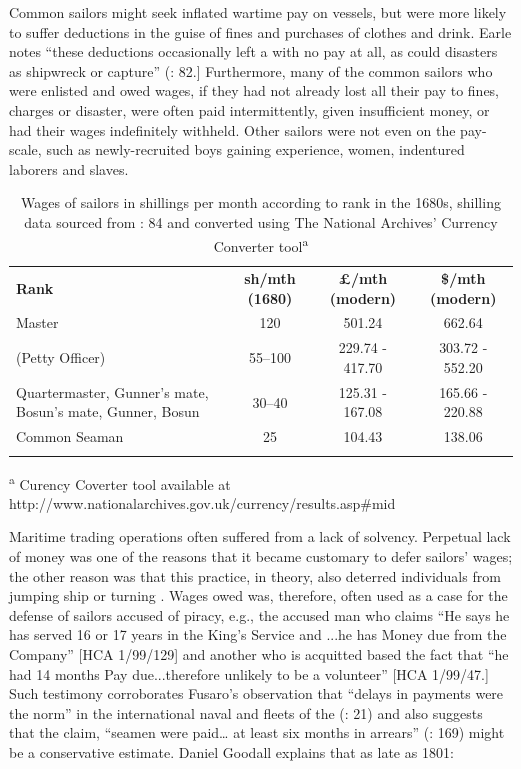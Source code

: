 Common sailors might seek inflated wartime pay on  vessels, but were more likely to suffer deductions in the guise of fines and purchases of clothes and drink. Earle notes “these deductions occasionally left a  with no pay at all, as could disasters as shipwreck or capture” (\citeyear*{Earle1998}: 82.] Furthermore, many of the common sailors who were enlisted and owed wages, if they had not already lost all their pay to fines, charges or disaster, were often paid intermittently, given insufficient money, or had their wages indefinitely withheld. Other sailors were not even on the pay-scale, such as newly-recruited boys gaining experience, women, indentured laborers and slaves. 

\begin{table}
\caption{\label{tab:key:3.2} Wages of sailors in shillings per month according to rank in the 1680s, shilling data sourced from \citealt{Earle1998}: 84 and converted using The National Archives’ Currency Converter tool\textsuperscript{a}}

\begin{tabularx}{\textwidth}{Qccc}
\lsptoprule

\textbf{Rank} & \textbf{sh/mth (1680)} & \textbf{£/mth (modern)} & \textbf{\$/mth (modern)}\\
Master & 120 & 501.24 & 662.64\\
\midrule
{} (Petty Officer) & 55--100 & 229.74 - 417.70 & 303.72 - 552.20\\
Quartermaster, Gunner’s mate, Bosun’s mate, Gunner, Bosun & 30--40 & 125.31 - 167.08 & 165.66 - 220.88\\
Common Seaman & 25 & 104.43 & 138.06\\
\lspbottomrule
\end{tabularx}\end{table}
\textsuperscript{a} Curency Coverter tool available at http://www.nationalarchives.gov.uk/currency/results.asp\#mid

Maritime trading operations often suffered from a lack of solvency. Perpetual lack of money was one of the reasons that it became customary to defer sailors’ wages; the other reason was that this practice, in theory, also deterred individuals from jumping ship or turning . Wages owed was, therefore, often used as a case for the defense of sailors accused of piracy, e.g., the accused man who claims “He says he has served 16 or 17 years in the King’s Service and ...he has Money due from the Company” [HCA 1/99/129] and another who is acquitted based the fact that “he had 14 months Pay due...therefore unlikely to be a volunteer” [HCA 1/99/47.] Such testimony corroborates Fusaro’s observation that “delays in payments were the norm” in the international naval and  fleets of the  (\citeyear*{Fusaro2015}: 21) and also suggests that the claim, “seamen were paid… at least six months in arrears” (\citealt{AdkinsAdkins2008}: 169) might be a conservative estimate. Daniel Goodall explains that as late as 1801:

